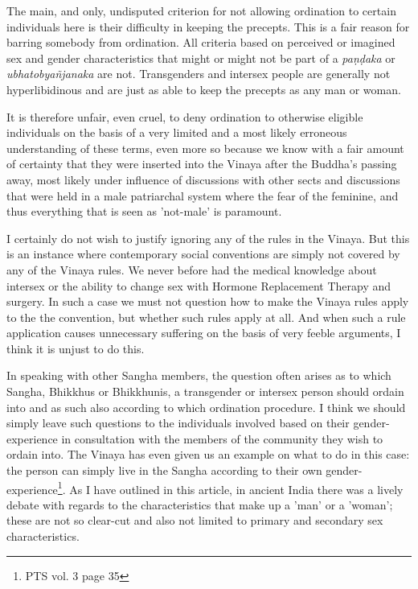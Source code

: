 The main, and only, undisputed criterion for not allowing ordination to certain individuals here is their difficulty in keeping the precepts. This is a fair reason for barring somebody from ordination. All criteria based on perceived or imagined sex and gender characteristics that might or might not be part of a {\em paṇḍaka} or {\em ubhatob­yañ­janaka} are not. Transgenders and intersex people are generally not hyperlibidinous and are just as able to keep the precepts as any man or woman. 

It is therefore unfair, even cruel, to deny ordination to otherwise eligible individuals on the basis of a very limited and a most likely erroneous understanding of these terms, even more so because we know with a fair amount of certainty that they were inserted into the Vinaya after the Buddha's passing away, most likely under influence of discussions with other sects and discussions that were held in a male patriarchal system where the fear of the feminine, and thus everything that is seen as 'not-male' is paramount. 

I certainly do not wish to justify ignoring any of the rules in the Vinaya. But this is an instance where contemporary social conventions are simply not covered by any of the Vinaya rules. We never before had the medical knowledge about intersex or the ability to change sex with Hormone Replacement Therapy and surgery. In such a case we must not question how to make the Vinaya rules apply to the the convention, but whether such rules apply at all. And when such a rule application causes unnecessary suffering on the basis of very feeble arguments, I think it is unjust to do this. 

In speaking with other Sangha members, the question often arises as to which Sangha, Bhikkhus or Bhikkhunis, a transgender or intersex person should ordain into and as such also according to which ordination procedure. I think we should simply leave such questions to the individuals involved based on their gender-experience in consultation with the members of the community they wish to ordain into. The Vinaya has even given us an example on what to do in this case: the person can simply live in the Sangha according to their own gender-experience\footnote{PTS vol. 3 page 35}. As I have outlined in this article, in ancient India there was a lively debate with regards to the characteristics that make up a 'man' or a 'woman'; these are not so clear-cut and also not limited to primary and secondary sex characteristics. 

